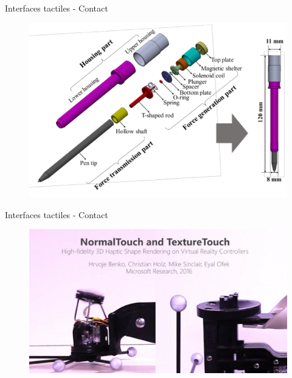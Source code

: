 {
\begin{frame}{Interfaces tactiles - Contact}
\begin{figure}
\centering
\includegraphics[width=\linewidth]{images/stylus}
\end{figure}
\end{frame}
}

{
\begin{frame}{Interfaces tactiles - Contact}
\begin{figure}
\href{run:videos/microsoft_texture.mp4}{\includegraphics[width=\linewidth]{images/microsoft_textureTouch}}
\end{figure}

\end{frame}
}


